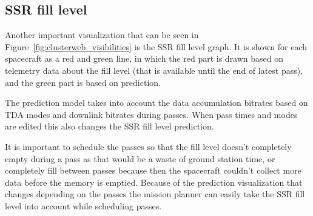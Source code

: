\subsection{SSR fill level}
Another important visualization that can be seen in Figure~\ref{fig:clusterweb_visibilities} is the SSR fill level graph. It is shown for each spacecraft as a red and green line, in which the red part is drawn based on telemetry data about the fill level (that is available until the end of latest pass), and the green part is based on prediction. 

The prediction model takes into account the data accumulation bitrates based on TDA modes and downlink bitrates during passes. When pass times and modes are edited this also changes the SSR fill level prediction. 

It is important to schedule the passes so that the fill level doesn't completely empty during a pass as that would be a waste of ground station time, or completely fill between passes because then the spacecraft couldn't collect more data before the memory is emptied. Because of the prediction visualization that changes depending on the passes the mission planner can easily take the SSR fill level into account while scheduling passes.
